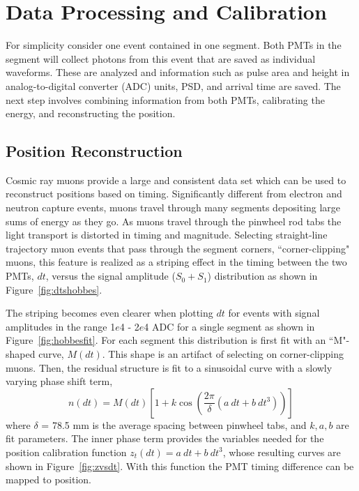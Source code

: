 \section{Data Processing and Calibration}

For simplicity consider one event contained in one segment. 
Both PMTs in the segment will collect photons from this event that are saved as individual waveforms. 
These are analyzed and information such as pulse area and height in analog-to-digital converter (ADC) units, PSD, and arrival time are saved. 
The next step involves combining information from both PMTs, calibrating the energy, and reconstructing the position. 


\subsection{Position Reconstruction}

Cosmic ray muons provide a large and consistent data set which can be used to reconstruct positions based on timing.
Significantly different from electron and neutron capture events, muons travel through many segments depositing large sums of energy as they go.
As muons travel through the pinwheel rod tabs the light transport is distorted in timing and magnitude. 
Selecting straight-line trajectory muon events that pass through the segment corners, ``corner-clipping" muons, this feature is realized as a striping effect in the timing between the two PMTs, $dt$, versus the signal amplitude ($S_0 + S_1$) distribution as shown in Figure~\ref{fig:dtshobbes}.

The striping becomes even clearer when plotting $dt$ for events with signal amplitudes in the range  1$e$4 -  2$e$4 ADC for a single segment as shown in Figure~\ref{fig:hobbesfit}.
For each segment this distribution is first fit with an ``M"-shaped curve, $M(dt)$. 
This shape is an artifact of selecting on corner-clipping muons. 
Then, the residual structure is fit to a sinusoidal curve with a slowly varying phase shift term,
\begin{equation}
	n(dt) = M(dt)\left[1 + k\cos\left(\frac{2\pi}{\delta}\left(a~dt + b~dt^3\right)\right)\right]
\end{equation}
where $\delta$ = 78.5 mm is the average spacing between pinwheel tabs, and $k, a, b$ are fit parameters.
The inner phase term provides the variables needed for the position calibration function $z_t(dt) = a~dt + b~dt^3$, whose resulting curves are shown in Figure~\ref{fig:zvsdt}.
With this function the PMT timing difference can be mapped to position.

